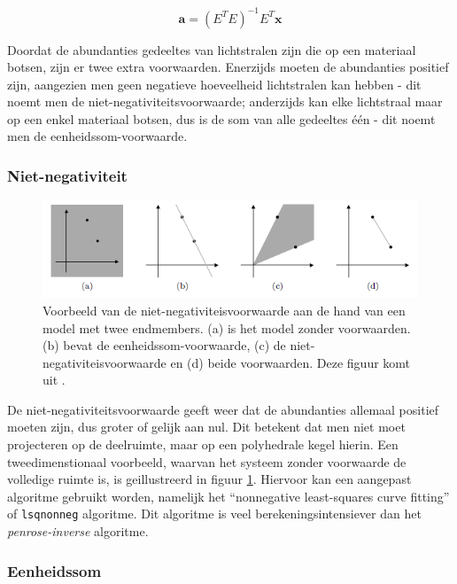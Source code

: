 \documentclass[12pt]{report}
\begin{document}
\begin{equation}
\bm{a} = (E^T E)^{-1} E^T \bm{x}
\end{equation}

Doordat de abundanties gedeeltes van lichtstralen zijn die op een materiaal botsen, zijn er twee extra voorwaarden. Enerzijds moeten de abundanties positief zijn, aangezien men geen negatieve hoeveelheid lichtstralen kan hebben - dit noemt men de niet-negativiteitsvoorwaarde; anderzijds kan elke lichtstraal maar op een enkel materiaal botsen, dus is de som van alle gedeeltes \'e\'en - dit noemt men de eenheidssom-voorwaarde.  


\subsubsection{Niet-negativiteit}

\begin{figure}
\includegraphics[width=\textwidth]{nonneg.PNG}
\caption{Voorbeeld van de niet-negativiteisvoorwaarde aan de hand van een model met twee endmembers. (a) is het model zonder voorwaarden. (b) bevat de eenheidssom-voorwaarde, (c) de niet-negativiteisvoorwaarde en (d) beide voorwaarden. Deze figuur komt uit \cite{cursus}. \label{fig:nonneg}}
\end{figure}

De niet-negativiteitsvoorwaarde geeft weer dat de abundanties allemaal positief moeten zijn, dus groter of gelijk aan nul. Dit betekent dat men niet moet projecteren op de deelruimte, maar op een polyhedrale kegel hierin. Een tweedimenstionaal voorbeeld, waarvan het systeem zonder voorwaarde de volledige ruimte is, is geillustreerd in figuur \ref{fig:nonneg}. Hiervoor kan een aangepast algoritme gebruikt worden, namelijk het ``nonnegative least-squares curve fitting'' of \texttt{lsqnonneg} algoritme. Dit algoritme is veel berekeningsintensiever dan het \textit{penrose-inverse} algoritme.

\subsubsection{Eenheidssom}
\end{document}
